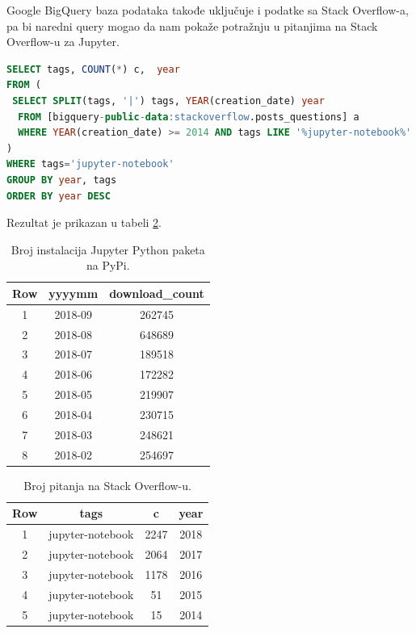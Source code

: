 \documentclass[a4paper]{article}
\begin{document}
Google BigQuery baza podataka takođe uključuje i podatke sa Stack Overflow-a, pa bi naredni query mogao da nam pokaže potražnju u pitanjima na Stack Overflow-u za Jupyter.

\begin{lstlisting}[caption={Broj pitanja na Stack Overflow-u za Jupyter},frame=single, label=simple, language=SQL]
SELECT tags, COUNT(*) c,  year
FROM (
 SELECT SPLIT(tags, '|') tags, YEAR(creation_date) year
  FROM [bigquery-public-data:stackoverflow.posts_questions] a
  WHERE YEAR(creation_date) >= 2014 AND tags LIKE '%jupyter-notebook%'
)
WHERE tags='jupyter-notebook'
GROUP BY year, tags
ORDER BY year DESC
\end{lstlisting}

Rezultat je prikazan u tabeli \ref{tab:tabela2}.

\begin{table}[h!]
\begin{center}
\caption{Broj instalacija Jupyter Python paketa na PyPi.}
\begin{tabular}{|c|c|c|} \hline
Row& yyyymm& download\_count\\ \hline
1&2018-09&262745\\
2&2018-08&648689\\
3&2018-07&189518\\
4&2018-06&172282\\
5&2018-05&219907\\
6&2018-04&230715\\
7&2018-03&248621\\
8&2018-02&254697\\ \hline
\end{tabular}
\label{tab:tabela1}
\end{center}
\end{table}

\begin{table}[h!]
\begin{center}
\caption{Broj pitanja na Stack Overflow-u.}
\begin{tabular}{|c|c|c|c|} \hline
Row& tags& c& year\\ \hline
1&jupyter-notebook&2247&2018\\
2&jupyter-notebook&2064&2017\\
3&jupyter-notebook&1178&2016\\
4&jupyter-notebook&51&2015\\
5&jupyter-notebook&15&2014\\ \hline
\end{tabular}
\label{tab:tabela2}
\end{center}
\end{table}
\end{document}
